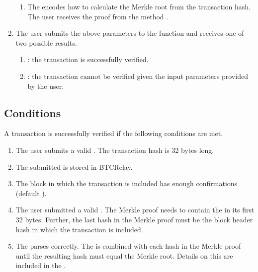 \documentclass[letterpaper,10pt,english]{sphinxmanual}
\begin{document}
\begin{enumerate}
\begin{enumerate}
\item {} 
The  encodes how to calculate the Merkle root from the transaction hash. The user receives the proof from the  method .

\end{enumerate}

\item {} 
The user submits the above parameters to the  function and receives one of two possible results.
\begin{enumerate}
%
\item {} 
: the transaction is successfully verified.

\item {} 
: the transaction cannot be verified given the input parameters provided by the user.

\end{enumerate}

\end{enumerate}


\subsection{Conditions}
\label{\detokenize{functions:conditions}}
A transaction is successfully verified if the following conditions are met.
\begin{enumerate}
%
\item {} 
The user submits a valid . The transaction hash is 32 bytes long.

\item {} 
The submitted  is stored in BTCRelay.

\item {} 
The block in which the transaction is included has enough confirmations (default ).

\item {} 
The user submitted a valid . The Merkle proof needs to contain the  in its first 32 bytes. Further, the last hash in the Merkle proof must be the block header hash in which the transaction is included.

\item {} 
The  parses correctly. The  is combined with each hash in the Merkle proof until the resulting hash must equal the Merkle root. Details on this are included in the .

\end{enumerate}
\end{document}
